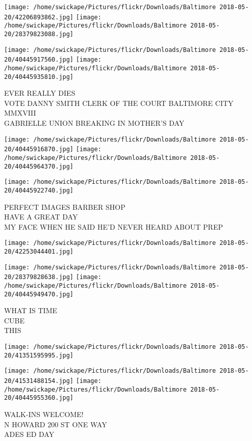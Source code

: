 \documentclass[10pt,letterpaper]{article}
\begin{document}
\texttt{[image: /home/swickape/Pictures/flickr/Downloads/Baltimore 2018-05-20/42206893862.jpg]}
\texttt{[image: /home/swickape/Pictures/flickr/Downloads/Baltimore 2018-05-20/28379823088.jpg]}

\texttt{[image: /home/swickape/Pictures/flickr/Downloads/Baltimore 2018-05-20/40445917560.jpg]}
\texttt{[image: /home/swickape/Pictures/flickr/Downloads/Baltimore 2018-05-20/40445935810.jpg]}

EVER REALLY DIES\\
VOTE DANNY SMITH CLERK OF THE COURT BALTIMORE CITY\\
MMXVIII\\
GABRIELLE UNION BREAKING IN MOTHER'S DAY
\pagebreak

\texttt{[image: /home/swickape/Pictures/flickr/Downloads/Baltimore 2018-05-20/40445916870.jpg]}
\texttt{[image: /home/swickape/Pictures/flickr/Downloads/Baltimore 2018-05-20/40445964370.jpg]}

\texttt{[image: /home/swickape/Pictures/flickr/Downloads/Baltimore 2018-05-20/40445922740.jpg]}

PERFECT IMAGES BARBER SHOP\\
HAVE A GREAT DAY\\
MY FACE WHEN HE SAID HE'D NEVER HEARD ABOUT PREP
\pagebreak

\texttt{[image: /home/swickape/Pictures/flickr/Downloads/Baltimore 2018-05-20/42253044401.jpg]}

\vspace{0.25in}
\texttt{[image: /home/swickape/Pictures/flickr/Downloads/Baltimore 2018-05-20/28379828638.jpg]}
\texttt{[image: /home/swickape/Pictures/flickr/Downloads/Baltimore 2018-05-20/40445949470.jpg]}

WHAT IS TIME\\
CUBE\\
THIS
\pagebreak

\texttt{[image: /home/swickape/Pictures/flickr/Downloads/Baltimore 2018-05-20/41351595995.jpg]}

\vspace{0.25in}
\texttt{[image: /home/swickape/Pictures/flickr/Downloads/Baltimore 2018-05-20/41531488154.jpg]}
\texttt{[image: /home/swickape/Pictures/flickr/Downloads/Baltimore 2018-05-20/40445955360.jpg]}

WALK{-}INS WELCOME!\\
N HOWARD 200 ST ONE WAY\\
ADES ED DAY
\pagebreak
\end{document}

